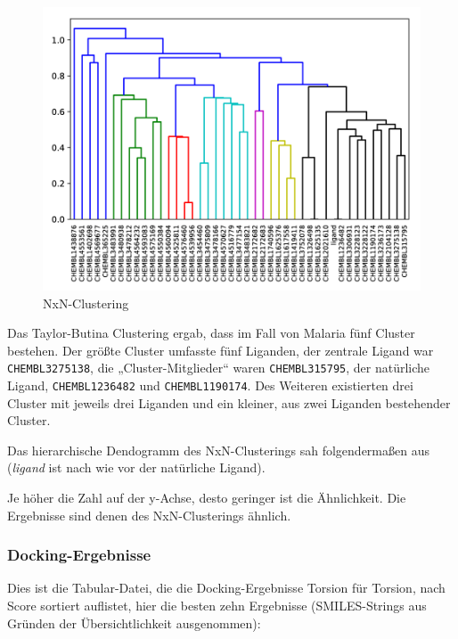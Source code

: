 \documentclass[10pt]{article}
\begin{document}
    \begin{figure}
        \includegraphics[width=\linewidth]{malaria-NxN_clustering}
        \caption{NxN-Clustering}\label{fig:nxn}
    \end{figure}

    Das Taylor-Butina Clustering ergab, dass im Fall von Malaria fünf Cluster bestehen.
    Der größte Cluster umfasste
    fünf Liganden, der zentrale Ligand war \texttt{CHEMBL3275138}, die „Cluster-Mitglieder“ waren
    \texttt{CHEMBL315795}, der natürliche
    Ligand, \texttt{CHEMBL1236482} und \texttt{CHEMBL1190174}.
    Des Weiteren existierten drei Cluster mit jeweils drei
    Liganden und ein kleiner, aus zwei Liganden bestehender Cluster.

    Das hierarchische Dendogramm des NxN-Clusterings sah folgendermaßen aus (\emph{ligand} ist nach wie vor der
    natürliche
    Ligand).


    Je höher die Zahl auf der y-Achse, desto geringer ist die Ähnlichkeit. Die Ergebnisse sind denen des
    NxN-Clusterings ähnlich.

    \subsubsection{Docking-Ergebnisse}
    Dies ist die Tabular-Datei, die die Docking-Ergebnisse Torsion für Torsion, nach Score sortiert auflistet, hier
    die besten zehn Ergebnisse (SMILES-Strings aus Gründen der Übersichtlichkeit ausgenommen):
\end{document}
